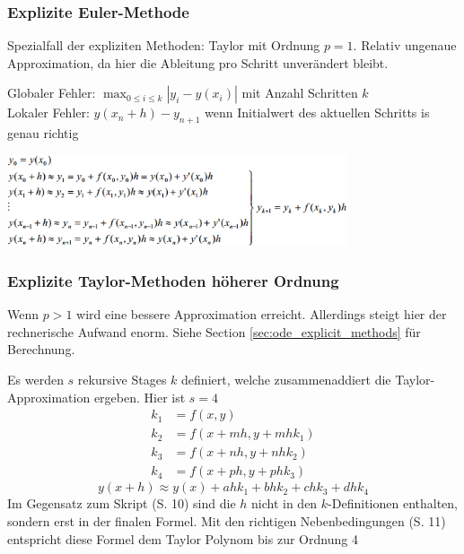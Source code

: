     
    
    
    \begin{minipage}{8cm}
      \subsubsection{Explizite Euler-Methode}
        Spezialfall der expliziten Methoden: Taylor mit Ordnung $p=1$. Relativ ungenaue Approximation,
        da hier die Ableitung pro Schritt unverändert bleibt. 
        
        Globaler Fehler: $\max_{0 \leq i \leq k} |y_i - y(x_i)|$ mit Anzahl Schritten $k$\\
        Lokaler Fehler: $y(x_n+h) - y_{n+1}$ wenn Initialwert des aktuellen Schritts is genau richtig
    \end{minipage}
    \hspace{8mm}
    \begin{minipage}{11cm}
      \includegraphics[width=10cm]{./bilder/ode_euler.png}
    \end{minipage}
      
    \subsubsection{Explizite Taylor-Methoden höherer Ordnung}
      Wenn $p > 1$ wird eine bessere Approximation erreicht. Allerdings steigt hier der rechnerische
      Aufwand enorm. Siehe Section \ref{sec:ode_explicit_methods} für Berechnung.
      
 \newpage     
      Es werden $s$ rekursive Stages $k$ definiert, welche zusammenaddiert die Taylor-Approximation ergeben.
      Hier ist $s=4$
      \begin{align*}
        k_1 &= f(x,y)\\
        k_2 &= f(x + m h, y+m h k_1)\\
        k_3 &= f(x + n h, y+n h  k_2)\\
        k_4 &= f(x + p h, y+p h k_3) 
      \end{align*}     
      $$y(x+h) \approx y(x) + a h k_1 + b h k_2 + c h k_3 + d h k_4 $$ 
      Im Gegensatz zum Skript (S. 10) sind die 
      $h$ nicht in den $k$-Definitionen enthalten, sondern erst in der finalen Formel. Mit den richtigen Nebenbedingungen (S. 11) 
      entspricht diese Formel dem Taylor Polynom bis zur Ordnung 4
      
